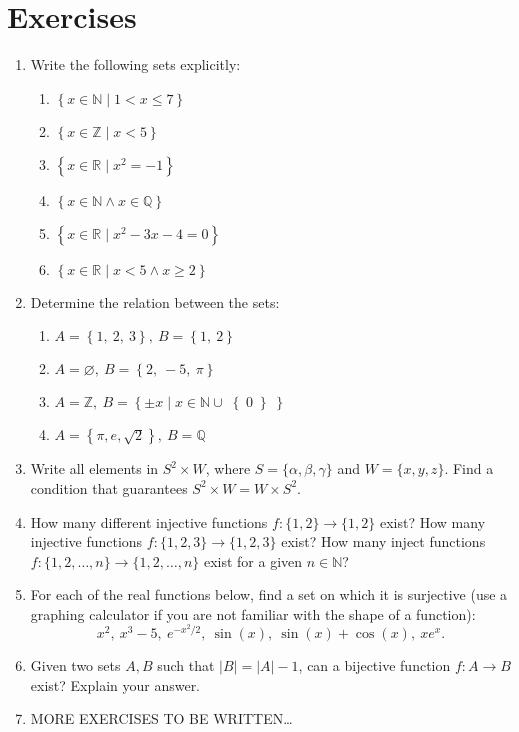 \section{Exercises}
\begin{enumerate}
  \item Write the following sets explicitly:
    \begin{enumerate}[label=(\roman*)]
      \item $\left\{ x\in \mathbb{N}\mid1<x\leq7\right\}$
      \item $\left\{ x\in \mathbb{Z}\mid x<5\right\}$
      \item $\left\{ x\in \mathbb{R}\mid x^{2}=-1 \right\}$
      \item $\left\{ x\in \mathbb{N} \wedge x\in \mathbb{Q} \right\}$
      \item $\left\{ x\in \mathbb{R} \mid x^{2}-3x-4=0 \right\}$
      \item $\left\{ x\in\mathbb{R}\mid x<5\wedge x \geq 2\right\}$
    \end{enumerate}
  
	\item Determine the relation between the sets:
    \begin{enumerate}[label=(\roman*)]
      \item $A=\left\{ 1,\ 2,\ 3\right\},\ B=\left\{ 1,\ 2 \right\}$
      \item $A=\varnothing,\ B=\left\{ 2,\ -5,\ \pi \right\}$
      \item $A=\mathbb{Z},\ B=\left\{ \pm x \mid x\in\mathbb{N} \cup \right\{0\left\} \right\}$
			\item $A=\left\{\pi, e, \sqrt{2}\right\},\ B=\mathbb{Q}$
    \end{enumerate}

	\item Write all elements in $S^{2}\times W$, where $S=\{\alpha,\beta,\gamma\}$ and $W=\{x,y,z\}$. Find a condition that guarantees $S^{2}\times W = W\times S^{2}$.

	\item How many different injective functions $f:\{1,2\}\to\{1,2\}$ exist? How many injective functions $f:\{1,2,3\}\to\{1,2,3\}$ exist? How many inject functions $f:\{1,2,\dots,n\}\to\{1,2,\dots,n\}$ exist for a given $n\in\mathbb{N}$?

	\item For each of the real functions below, find a set on which it is surjective (use a graphing calculator if you are not familiar with the shape of a function):
		\[
			x^{2},\ x^{3}-5,\ e^{-x^{2}/2},\ \sin(x),\ \sin(x)+\cos(x),\ xe^{x}.
		\]

	\item Given two sets $A,B$ such that $|B|=|A|-1$, can a bijective function $f:A\to B$ exist? Explain your answer.
	\item MORE EXERCISES TO BE WRITTEN\ldots
\end{enumerate}
